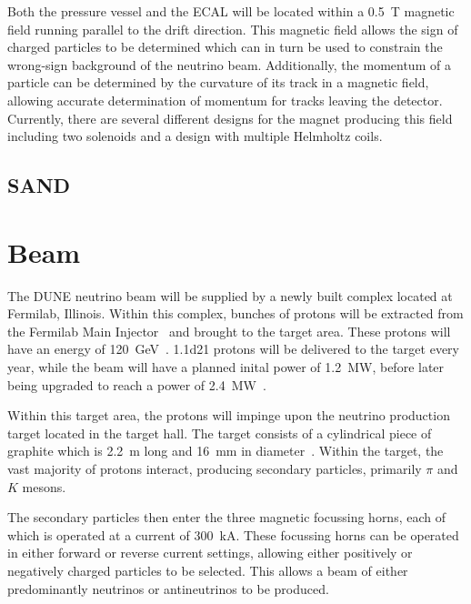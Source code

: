 Both the pressure vessel and the ECAL will be located within a \SI{0.5}{\tesla} magnetic field running parallel to the drift direction.
This magnetic field allows the sign of charged particles to be determined which can in turn be used to constrain the wrong-sign background of the neutrino beam.
Additionally, the momentum of a particle can be determined by the curvature of its track in a magnetic field, allowing accurate determination of momentum for tracks leaving the detector.
Currently, there are several different designs for the magnet producing this field including two solenoids and a design with multiple Helmholtz coils. 

\subsection{SAND}
\label{sec:dune:nd:sand}

\section{Beam}
\label{sec:dune:beam}

The DUNE neutrino beam will be supplied by a newly built complex located at Fermilab, Illinois.
Within this complex, bunches of protons will be extracted from the Fermilab Main Injector~\cite{mainInjector} and brought to the target area.
These protons will have an energy of \SI{120}{\giga\electronvolt}~\cite{duneBeam}.
\num{1.1d21} protons will be delivered to the target every year, while the beam will have a planned inital power of \SI{1.2}{\mega\watt}, before later being upgraded to reach a power of \SI{2.4}{\mega\watt}~\cite{duneBeam}.

Within this target area, the protons will impinge upon the neutrino production target located in the target hall.
The target consists of a cylindrical piece of graphite which is \SI{2.2}{\metre} long and \SI{16}{\milli\metre} in diameter~\cite{duneBeam}.
Within the target, the vast majority of protons interact, producing secondary particles, primarily $\pi$ and $K$ mesons.

The secondary particles then enter the three magnetic focussing horns, each of which is operated at a current of \SI{300}{\kilo\ampere}.
These focussing horns can be operated in either forward or reverse current settings, allowing either positively or negatively charged particles to be selected.
This allows a beam of either predominantly neutrinos or antineutrinos to be produced.

